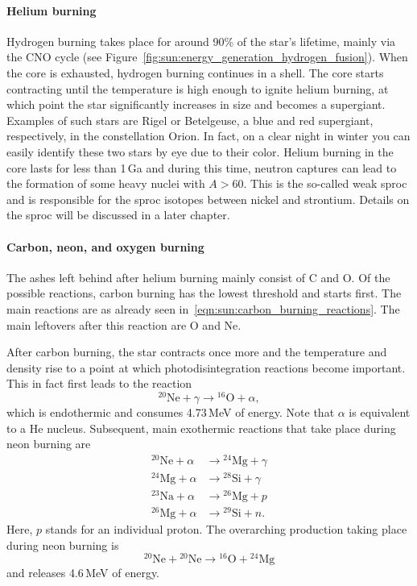 \paragraph{Helium burning}
Hydrogen burning takes place for around 90\% of the star's lifetime, mainly via the CNO cycle (see Figure~\ref{fig:sun:energy_generation_hydrogen_fusion}). When the core is exhausted, hydrogen burning continues in a shell. The core starts contracting until the temperature is high enough to ignite helium burning, at which point the star significantly increases in size and becomes a supergiant. Examples of such stars are Rigel or Betelgeuse, a blue and red supergiant, respectively, in the constellation Orion. In fact, on a clear night in winter you can easily identify these two stars by eye due to their color. Helium burning in the core lasts for less than 1\,Ga and during this time, neutron captures can lead to the formation of some heavy nuclei with $A>60$. This is the so-called weak \ac{sproc} and is responsible for the \ac{sproc} isotopes between nickel and strontium. Details on the \ac{sproc} will be discussed in a later chapter. %

\paragraph{Carbon, neon, and oxygen burning}
The ashes left behind after helium burning mainly consist of C and O. Of the possible reactions, carbon burning has the lowest threshold and starts first. The main reactions are as already seen in~\eqref{eqn:sun:carbon_burning_reactions}.
The main leftovers after this reaction are O and Ne.

After carbon burning, the star contracts once more and the temperature and density rise to a point at which photodisintegration reactions become important. This in fact first leads to the reaction
\begin{equation}
    {^{20}}\mathrm{Ne} + \gamma \longrightarrow {^{16}}\mathrm{O} + \alpha,
\end{equation}
which is endothermic and consumes 4.73\,MeV of energy. Note that $\alpha$ is equivalent to a He nucleus. Subsequent, main exothermic reactions that take place during neon burning are
\begin{align}
    {^{20}}\mathrm{Ne} + \alpha &\longrightarrow {^{24}}\mathrm{Mg} + \gamma \\
    {^{24}}\mathrm{Mg} + \alpha &\longrightarrow {^{28}}\mathrm{Si} + \gamma \\
    {^{23}}\mathrm{Na} + \alpha &\longrightarrow {^{26}}\mathrm{Mg} + p \\
    {^{26}}\mathrm{Mg} + \alpha &\longrightarrow {^{29}}\mathrm{Si} + n.
\end{align}
Here, $p$ stands for an individual proton. The overarching production taking place during neon burning is
\begin{equation}
    {^{20}}\mathrm{Ne} + {^{20}}\mathrm{Ne} \longrightarrow {^{16}}\mathrm{O} + {^{24}}\mathrm{Mg}
\end{equation}
and releases 4.6\,MeV of energy.

